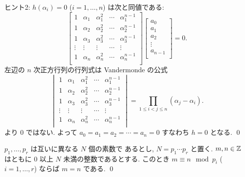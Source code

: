 \documentclass[12pt,twoside]{jarticle}
\begin{document}
\medskip
\noindent
ヒント2: $h(\alpha_i)=0$ ($i=1,\dots,n$) は次と同値である:
\begin{equation*}
  \begin{bmatrix}
    1      & \alpha_1 & \alpha_1^2 & \cdots & \alpha_1^{n-1} \\
    1      & \alpha_2 & \alpha_2^2 & \cdots & \alpha_2^{n-1} \\
    1      & \alpha_3 & \alpha_3^2 & \cdots & \alpha_3^{n-1} \\
    \vdots & \vdots   & \vdots     & \cdots & \vdots         \\
    1      & \alpha_n & \alpha_n^2 & \cdots & \alpha_n^{n-1} \\
  \end{bmatrix}
  \begin{bmatrix}
    a_0 \\ a_1 \\ a_2 \\ \vdots \\ a_{n-1} \\
  \end{bmatrix}
  = 0.
\end{equation*}
左辺の $n$ 次正方行列の行列式は Vandermonde の公式
\begin{equation*}
  \begin{vmatrix}
    1      & \alpha_1 & \alpha_1^2 & \cdots & \alpha_1^{n-1} \\
    1      & \alpha_2 & \alpha_2^2 & \cdots & \alpha_2^{n-1} \\
    1      & \alpha_3 & \alpha_3^2 & \cdots & \alpha_3^{n-1} \\
    \vdots & \vdots   & \vdots     & \cdots & \vdots         \\
    1      & \alpha_n & \alpha_n^2 & \cdots & \alpha_n^{n-1} \\
  \end{vmatrix}
  =
  \prod_{1\le i < j \le n} (\alpha_j - \alpha_i).
\end{equation*}
より $0$ ではない.
よって $a_0=a_1=a_2=\cdots=a_n=0$ すなわち $h=0$ となる.
\qed


\begin{question}
  $p_1,\dots,p_r$ は互いに異なる $N$ 個の素数で
  あるとし, $N=p_1\cdots p_r$ と置く.  
  $m,n\in{\mathbb Z}$ はともに $0$ 以上 $N$ 未満の整数であるとする. 
  このとき $m\equiv n\mod{p_i}$ ($i=1,\dots,r$) ならば $m=n$ である. 
  \qed
\end{question}
\end{document}
